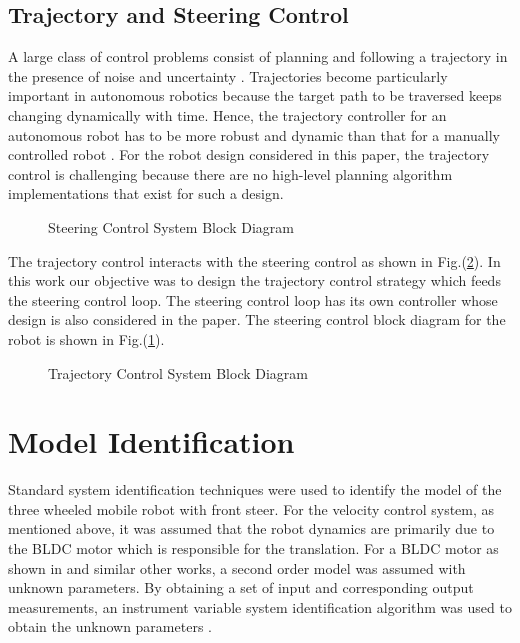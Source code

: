 \documentclass[conference]{IEEEtran}
\begin{document}
\subsection{Trajectory and Steering Control}
A large class of control problems consist of planning and following a trajectory in the presence of noise and uncertainty \cite{murray}. Trajectories become particularly important in autonomous robotics because the target path to be traversed keeps changing dynamically with time. Hence, the trajectory controller for an autonomous robot has to be more robust and dynamic than that for a manually controlled robot \cite{manual}. For the robot design considered in this paper, the trajectory control is challenging because there are no high-level planning algorithm implementations that exist for such a design. 
 \begin{figure}[htbp]
 			  \centering
% 			  
 			  \def\svgscale{0.25}
  			  \tiny{
  			  }
 			  \caption{Steering Control System Block Diagram}
 			 \label{steering}
 		\end{figure}	
The trajectory control interacts with the steering control as shown in Fig.(\ref{trablock}). In this work our objective was to design the trajectory control strategy which feeds the steering control loop. The steering control loop has its own controller whose design is also considered in the paper. The steering control block diagram for the robot is shown in Fig.(\ref{steering}).
\begin{figure}[htbp]

			  \centering
%			  
			  \def\svgscale{0.25}
			  \tiny{
			  }
			  \caption{Trajectory Control System Block Diagram}
			 \label{trablock}
		\end{figure}
\section{Model Identification}
\label{sysid}
Standard system identification techniques were used to identify the model of the three wheeled mobile robot with front steer. For the velocity control system, as mentioned above, it was assumed that the robot dynamics are primarily due to the BLDC motor which is responsible for the translation. For a BLDC motor as shown in \cite{bldcmodel} and similar other works, a second order model was assumed with unknown parameters. By obtaining a set of input and corresponding output measurements, an instrument variable system identification algorithm was used to obtain the unknown parameters \cite{iv}.
\end{document}
